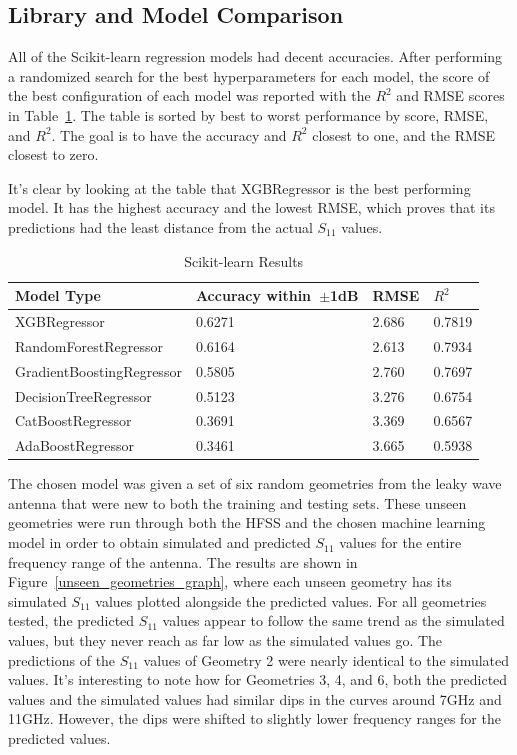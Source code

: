 \documentclass[conference]{IEEEtran}
\begin{document}
\subsection{Library and Model Comparison}
All of the Scikit-learn regression models had decent accuracies. After performing a randomized search for the best hyperparameters for each model, the score of the best configuration of each model was reported with the $R^2$ and RMSE scores in Table~\ref{comparing_sklearn}. The table is sorted by best to worst performance by score, RMSE, and $R^2$. The goal is to have the accuracy and $R^2$ closest to one, and the RMSE closest to zero. 

It's clear by looking at the table that XGBRegressor is the best performing model. It has the highest accuracy and the lowest RMSE, which proves that its predictions had the least distance from the actual $S_{11}$ values.


\begin{table}[h]
\caption{Scikit-learn Results}
\begin{center}
\begin{tabular}{ |l|l|l|l| }
    \hline
    Model Type & Accuracy within~$\pm$1dB & RMSE & $R^2$ \\ 
    \hline
    XGBRegressor & 0.6271 & 2.686 & 0.7819 \\  
    \hline
    RandomForestRegressor & 0.6164 & 2.613 & 0.7934 \\
    \hline  
    GradientBoostingRegressor & 0.5805 & 2.760 & 0.7697 \\
    \hline
    DecisionTreeRegressor & 0.5123 & 3.276 & 0.6754 \\  
    \hline
    CatBoostRegressor & 0.3691 & 3.369 & 0.6567 \\    
    \hline
    AdaBoostRegressor & 0.3461 & 3.665 & 0.5938 \\  
    \hline
\end{tabular}
\end{center}
\label{comparing_sklearn}
\end{table}

The chosen model was given a set of six random geometries from the leaky wave antenna that were new to both the training and testing sets. These unseen geometries were run through both the HFSS and the chosen machine learning model in order to obtain simulated and predicted $S_{11}$ values for the entire frequency range of the antenna. The results are shown in Figure~\ref{unseen_geometries_graph}, where each unseen geometry has its simulated $S_{11}$ values plotted alongside the predicted values. For all geometries tested, the predicted $S_{11}$ values appear to follow the same trend as the simulated values, but they never reach as far low as the simulated values go. The predictions of the $S_{11}$ values of Geometry 2 were nearly identical to the simulated values. It's interesting to note how for Geometries 3, 4, and 6, both the predicted values and the simulated values had similar dips in the curves around 7GHz and 11GHz. However, the dips were shifted to slightly lower frequency ranges for the predicted values.
\end{document}

